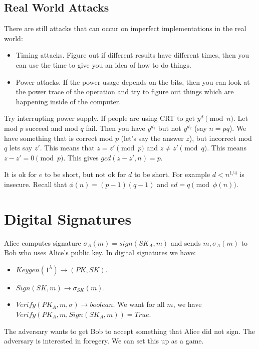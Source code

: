 \documentclass[psamsfonts]{amsart}
\begin{document}
\subsection{Real World Attacks}

There are still attacks that can occur on imperfect implementations in the real world:

\begin{itemize}
  \item Timing attacks. Figure out if different results have different times, then you can use the time to give you an idea of how to do things.
  \item Power attacks. If the power usage depends on the bits, then you can look at the power trace of the operation and try to figure out things which are happening inside of the computer.
\end{itemize}

Try interrupting power supply. If people are using CRT to get $y^d \pmod{n}$. Let mod $p$ succeed and mod $q$ fail. Then you have $y^{d_1}$ but not $y^{d_2}$ (say $n = pq$). We have something that is correct mod $p$ (let's say the answer $z$), but incorrect mod $q$ lets say $z'$. This means that $z = z' \pmod{p}$ and $z \neq z' \pmod{q}$. This means $z - z' = 0 \pmod{p}$. This gives $gcd(z - z', n) = p$.


It is ok for $e$ to be short, but not ok for $d$ to be short. For example $d < n^{1/4}$ is insecure. Recall that $\phi(n) = (p-1)(q-1)$ and $ed = q \pmod{\phi(n)}$.

\section{Digital Signatures}

Alice computes signature $\sigma_A(m) = sign(SK_A, m)$ and sends $m, \sigma_A(m)$ to Bob who uses Alice's public key. In digital signatures we have:
\begin{itemize}
  \item $Keygen(1^{\lambda}) \to (PK, SK)$.
  \item $Sign(SK, m) \to \sigma_{SK}(m)$.
  \item $Verify(PK_A, m, \sigma) \to boolean$. We want for all $m$, we have $Verify(PK_A, m, Sign(SK_A, m)) = True$.
\end{itemize}

The adversary wants to get Bob to accept something that Alice did not sign. The adversary is interested in foregery. We can set this up as a game.
\end{document}
